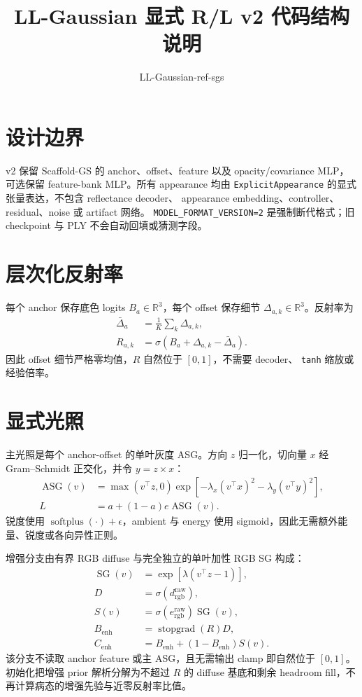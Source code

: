 \documentclass[UTF8]{ctexart}
\title{LL-Gaussian 显式 R/L v2 代码结构说明}
\author{LL-Gaussian-ref-sgs}
\date{}
\begin{document}
\maketitle

\section{设计边界}

v2 保留 Scaffold-GS 的 anchor、offset、feature 以及 opacity/covariance
MLP，可选保留 feature-bank MLP。所有 appearance 均由
\texttt{ExplicitAppearance} 的显式张量表达，不包含 reflectance decoder、
appearance embedding、controller、residual、noise 或 artifact 网络。
\texttt{MODEL\_FORMAT\_VERSION=2} 是强制断代格式；旧 checkpoint 与 PLY
不会自动回填或猜测字段。

\section{层次化反射率}

每个 anchor 保存底色 logits $B_a\in\mathbb{R}^3$，每个 offset 保存细节
$\Delta_{a,k}\in\mathbb{R}^3$。反射率为
\begin{align}
  \bar{\Delta}_a &= \frac{1}{K}\sum_k \Delta_{a,k},\\
  R_{a,k} &= \sigma(B_a+\Delta_{a,k}-\bar{\Delta}_a).
\end{align}
因此 offset 细节严格零均值，$R$ 自然位于 $[0,1]$，不需要 decoder、
\texttt{tanh} 缩放或经验倍率。

\section{显式光照}

主光照是每个 anchor-offset 的单叶灰度 ASG。方向 $z$ 归一化，切向量
$x$ 经 Gram--Schmidt 正交化，并令 $y=z\times x$：
\begin{align}
  \operatorname{ASG}(v)
  &= \max(v^\top z,0)
     \exp[-\lambda_x(v^\top x)^2-\lambda_y(v^\top y)^2],\\
  L &= a+(1-a)e\operatorname{ASG}(v).
\end{align}
锐度使用 $\operatorname{softplus}(\cdot)+\epsilon$，ambient 与 energy 使用
sigmoid，因此无需额外能量、锐度或各向异性正则。

增强分支由有界 RGB diffuse 与完全独立的单叶加性 RGB SG 构成：
\begin{align}
  \operatorname{SG}(v)&=\exp[\lambda(v^\top z-1)],\\
  D&=\sigma(d_{\mathrm{rgb}}^{\mathrm{raw}}),\\
  S(v)&=\sigma(e_{\mathrm{rgb}}^{\mathrm{raw}})\operatorname{SG}(v),\\
  B_{\mathrm{enh}}&=\operatorname{stopgrad}(R)D,\\
  C_{\mathrm{enh}}&=B_{\mathrm{enh}}+(1-B_{\mathrm{enh}})S(v).
\end{align}
该分支不读取 anchor feature 或主 ASG，且无需输出 clamp 即自然位于
$[0,1]$。初始化把增强 prior 解析分解为不超过 $R$ 的 diffuse 基底和剩余
headroom fill，不再计算病态的增强先验与近零反射率比值。
\end{document}
